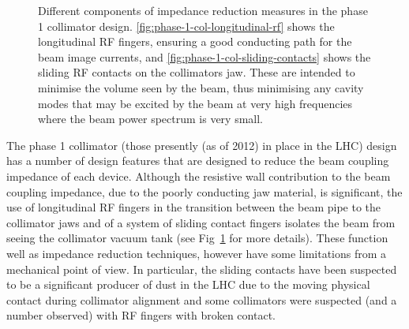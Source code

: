 \begin{figure}
\begin{center}

\end{center}
\caption{Different components of impedance reduction measures in the phase 1 collimator design. \ref{fig:phase-1-col-longitudinal-rf} shows the longitudinal RF fingers, ensuring a good conducting path for the beam image currents, and \ref{fig:phase-1-col-sliding-contacts} shows the sliding RF contacts on the collimators jaw. These are intended to minimise the volume seen by the beam, thus minimising any cavity modes that may be excited by the beam at very high frequencies where the beam power spectrum is very small.}
\label{fig:phase-1-rf}
\end{figure}

The phase 1 collimator (those presently (as of 2012) in place in the LHC) design has a number of design features that are designed to reduce the beam coupling impedance of each device. Although the resistive wall contribution to the beam coupling impedance, due to the poorly conducting jaw material, is significant, the use of longitudinal RF fingers in the transition between the beam pipe to the collimator jaws and of a system of sliding contact fingers isolates the beam from seeing the collimator vacuum tank (see Fig~\ref{fig:phase-1-rf} for more details). These function well as impedance reduction techniques, however have some limitations from a mechanical point of view. In particular, the sliding contacts have been suspected to be a significant producer of dust in the LHC due to the moving physical contact during collimator alignment and some collimators were suspected (and a number observed) with RF fingers with broken contact. 

